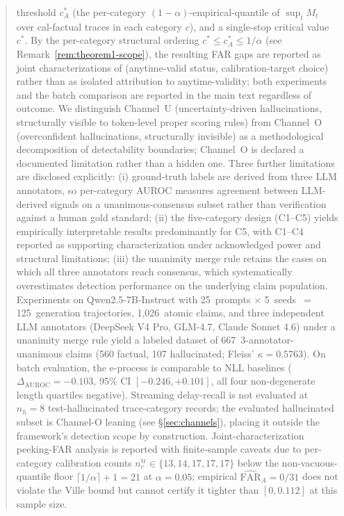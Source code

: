 \documentclass[runningheads]{llncs}
\begin{document}
\begin{abstract}
threshold $c_A^*$ (the per-category $(1-\alpha)$-empirical-quantile of
$\sup_t M_t$ over cal-factual traces in each category $c$), and a
single-stop critical value $c^*$. By the per-category structural ordering
$c^* \leq c_A^* \leq 1/\alpha$ (see Remark~\ref{rem:theorem1-scope}),
the resulting FAR gaps are reported as
joint characterizations of (anytime-valid status, calibration-target
choice) rather than as isolated attribution to anytime-validity; both
experiments and the batch comparison are reported in the main text
regardless of outcome.
We distinguish Channel~U (uncertainty-driven hallucinations,
structurally visible to token-level proper scoring rules) from
Channel~O (overconfident hallucinations, structurally invisible) as a
methodological decomposition of detectability boundaries; Channel~O
is declared a documented limitation rather than a hidden one. Three
further limitations are disclosed explicitly: (i) ground-truth labels
are derived from three LLM annotators, so per-category AUROC measures
agreement between LLM-derived signals on a unanimous-consensus subset
rather than verification against a human gold standard; (ii) the
five-category design (C1--C5) yields empirically interpretable
results predominantly for C5, with C1--C4 reported as supporting
characterization under acknowledged power and structural limitations;
(iii) the unanimity merge rule retains the cases on which all three
annotators reach consensus, which systematically overestimates
detection performance on the underlying claim population.
Experiments on Qwen2.5-7B-Instruct with 25~prompts $\times$
5~seeds~$=$ 125~generation trajectories, 1{,}026~atomic claims, and
three independent LLM annotators (DeepSeek V4 Pro, GLM-4.7, Claude
Sonnet 4.6) under a unanimity merge rule yield
a labeled dataset of
667~3-annotator-unanimous claims (560 factual, 107 hallucinated; Fleiss'
$\kappa = 0.5763$).
On batch evaluation, the e-process is comparable to NLL baselines
($\Delta_{\text{AUROC}} = -0.103$, 95\% CI $[-0.246, +0.101]$, all four
non-degenerate length quartiles negative).
Streaming delay-recall is not evaluated at $n_h = 8$ test-hallucinated
trace-category records; the evaluated hallucinated subset is Channel-O
leaning (see \S\ref{sec:channels}), placing it outside the framework's
detection scope by construction.
Joint-characterization peeking-FAR analysis is reported with finite-sample
caveats due to per-category calibration counts
$n_c^{\text{tr}} \in \{13,14,17,17,17\}$ below the non-vacuous-quantile
floor $\lceil 1/\alpha \rceil + 1 = 21$ at $\alpha = 0.05$; empirical
$\hat{\text{FAR}}_A = 0/31$ does not violate the Ville bound but cannot
certify it tighter than $[0, 0.112]$ at this sample size.
\end{abstract}
\end{document}
